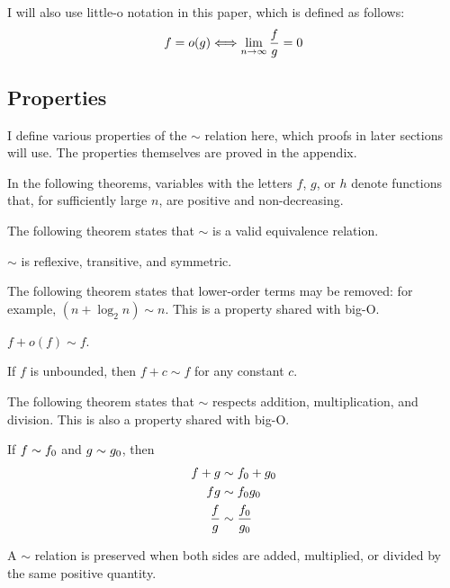 I will also use little-o notation in this paper, which is defined as follows:
\begin{align*}
f = o(g) \Longleftrightarrow \lim_{n \to \infty} \frac{f}{g} = 0
\end{align*}
\subsection{Properties}
\label{subsec:AsymptoticProperties}

I define various properties of the $\sim$ relation here, which proofs in later sections will use. The properties themselves are proved in the appendix.

{\HdrNote} In the following theorems, variables with the letters $f$, $g$, or $h$ denote functions that, for sufficiently large $n$, are positive and non-decreasing.

The following theorem states that $\sim$ is a valid equivalence relation.

\begin{theorem}
\label{thm:EquivalenceRelation}
	$\sim$ is reflexive, transitive, and symmetric.
\end{theorem}

The following theorem states that lower-order terms may be removed: for example, $(n + \log_2 n) \sim n$. This is a property shared with big-O.

\begin{theorem}
\label{thm:RemovesLowerOrderTerms}
	$f + o(f) \sim f$.
\end{theorem}

\begin{corollary}
\label{coro:PlusConstant}
	If $f$ is unbounded, then $f + c \sim f$ for any constant $c$.
\end{corollary}

The following theorem states that $\sim$ respects addition, multiplication, and division. This is also a property shared with big-O.

\begin{theorem}
\label{thm:MergesOverOps}
	If $f \sim f_0$ and $g \sim g_0$, then
	\begin{align*}
	f + g &\sim f_0 + g_0\\
	fg &\sim f_0g_0\\
	\frac{f}{g} &\sim \frac {f_0} {g_0}
	\end{align*}
\end{theorem}

\begin{corollary}
\label{coro:BothSides}
	A $\sim$ relation is preserved when both sides are added, multiplied, or divided by the same positive quantity.
\end{corollary}

